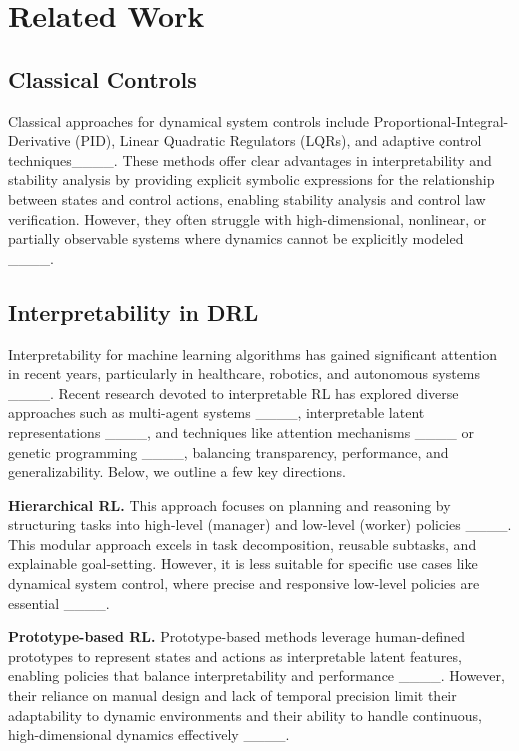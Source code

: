 \section{Related Work}
\subsection{Classical Controls} 
Classical approaches for dynamical system controls include Proportional-Integral-Derivative (PID), Linear Quadratic Regulators (LQRs), and adaptive control techniques____. These methods offer clear advantages in interpretability and stability analysis by providing explicit symbolic expressions for the relationship between states and control actions, enabling stability analysis and control law verification. However, they often struggle with high-dimensional, nonlinear, or partially observable systems where dynamics cannot be explicitly modeled ____. 


\subsection{Interpretability in DRL} 
Interpretability for machine learning algorithms has gained significant attention in recent years, particularly in healthcare, robotics, and autonomous systems ____. Recent research devoted to interpretable RL has explored diverse approaches such as multi-agent systems ____, interpretable latent representations ____, and techniques like attention mechanisms ____ or genetic programming ____, balancing transparency, performance, and generalizability. Below, we outline a few key directions.

\textbf{Hierarchical RL.} This approach focuses on planning and reasoning by structuring tasks into high-level (manager) and low-level (worker) policies ____. This modular approach excels in task decomposition, reusable subtasks, and explainable goal-setting. However, it is less suitable for specific use cases like dynamical system control, where precise and responsive low-level policies are essential ____.

\textbf{Prototype-based RL.} 
Prototype-based methods leverage human-defined prototypes to represent states and actions as interpretable latent features, enabling policies that balance interpretability and performance ____. However, their reliance on manual design and lack of temporal precision limit their adaptability to dynamic environments and their ability to handle continuous, high-dimensional dynamics effectively ____.


